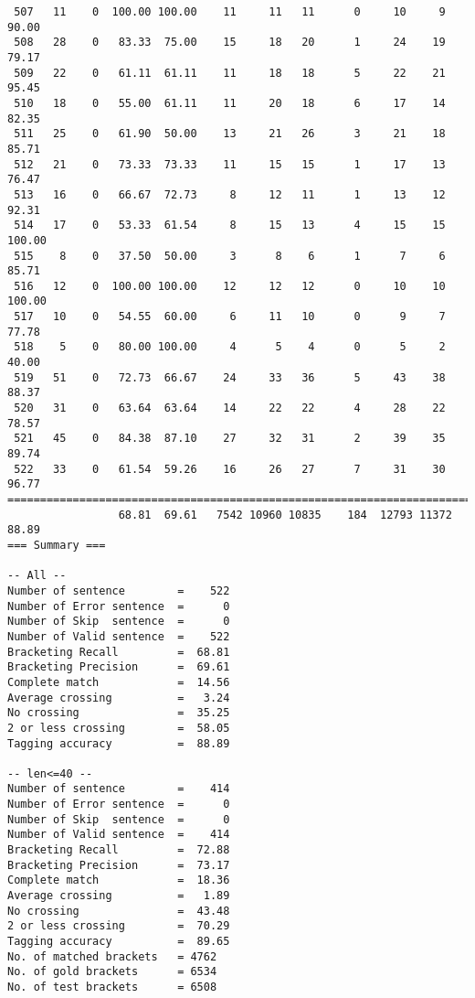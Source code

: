 \begin{verbatim}
 507   11    0  100.00 100.00    11     11   11      0     10     9    90.00
 508   28    0   83.33  75.00    15     18   20      1     24    19    79.17
 509   22    0   61.11  61.11    11     18   18      5     22    21    95.45
 510   18    0   55.00  61.11    11     20   18      6     17    14    82.35
 511   25    0   61.90  50.00    13     21   26      3     21    18    85.71
 512   21    0   73.33  73.33    11     15   15      1     17    13    76.47
 513   16    0   66.67  72.73     8     12   11      1     13    12    92.31
 514   17    0   53.33  61.54     8     15   13      4     15    15   100.00
 515    8    0   37.50  50.00     3      8    6      1      7     6    85.71
 516   12    0  100.00 100.00    12     12   12      0     10    10   100.00
 517   10    0   54.55  60.00     6     11   10      0      9     7    77.78
 518    5    0   80.00 100.00     4      5    4      0      5     2    40.00
 519   51    0   72.73  66.67    24     33   36      5     43    38    88.37
 520   31    0   63.64  63.64    14     22   22      4     28    22    78.57
 521   45    0   84.38  87.10    27     32   31      2     39    35    89.74
 522   33    0   61.54  59.26    16     26   27      7     31    30    96.77
============================================================================
                 68.81  69.61   7542 10960 10835    184  12793 11372    88.89
=== Summary ===

-- All --
Number of sentence        =    522
Number of Error sentence  =      0
Number of Skip  sentence  =      0
Number of Valid sentence  =    522
Bracketing Recall         =  68.81
Bracketing Precision      =  69.61
Complete match            =  14.56
Average crossing          =   3.24
No crossing               =  35.25
2 or less crossing        =  58.05
Tagging accuracy          =  88.89

-- len<=40 --
Number of sentence        =    414
Number of Error sentence  =      0
Number of Skip  sentence  =      0
Number of Valid sentence  =    414
Bracketing Recall         =  72.88
Bracketing Precision      =  73.17
Complete match            =  18.36
Average crossing          =   1.89
No crossing               =  43.48
2 or less crossing        =  70.29
Tagging accuracy          =  89.65
No. of matched brackets   = 4762
No. of gold brackets      = 6534
No. of test brackets      = 6508

\end{verbatim}

\normalsize

